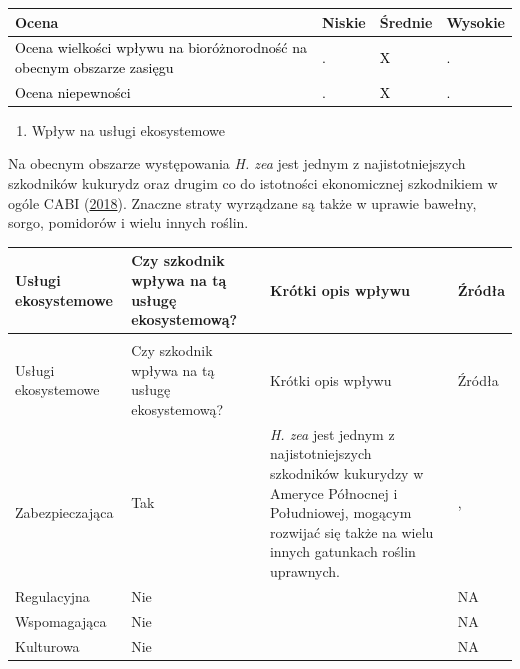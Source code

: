 \documentclass[polish,a4paper]{article}
\providecommand{\tightlist}{%
  \setlength{\itemsep}{0pt}\setlength{\parskip}{0pt}}
\begin{document}
\begin{tabu} to 
\toprule
{}  \textbf{Ocena} & \textbf{Niskie} & \textbf{Średnie} & \textbf{Wysokie}\\
\midrule
{}  \textcolor{black}{Ocena wielkości wpływu na bioróżnorodność na obecnym obszarze zasięgu} & \textcolor{black}{.} & \textcolor{black}{X} & \textcolor{black}{.}\\
  \textcolor{black}{Ocena niepewności} & \textcolor{black}{.} & \textcolor{black}{X} & \textcolor{black}{.}\\
\bottomrule
\end{tabu}

\begin{enumerate}
\def\labelenumi{\Roman{enumi})}
\setcounter{enumi}{1}
\tightlist
\item
  Wpływ na usługi ekosystemowe
\end{enumerate}

Na obecnym obszarze występowania \emph{H. zea} jest jednym z
najistotniejszych szkodników kukurydz oraz drugim co do istotności
ekonomicznej szkodnikiem w ogóle CABI
(\protect\hyperlink{ref-cabi2017}{2018}). Znaczne straty wyrządzane są
także w uprawie bawełny, sorgo, pomidorów i wielu innych roślin.

\begin{longtabu} to 
\toprule
{}  \textbf{Usługi ekosystemowe} & \textbf{Czy szkodnik wpływa na tą usługę ekosystemową?} & \textbf{Krótki opis wpływu} & \textbf{Źródła}\\
\midrule
\endfirsthead
{}\\
\toprule
Usługi ekosystemowe & Czy szkodnik wpływa na tą usługę ekosystemową? & Krótki opis wpływu & Źródła\\
\midrule
\endhead
\
\endfoot
\bottomrule
\endlastfoot
Zabezpieczająca & Tak & \textit{H. zea} jest jednym z najistotniejszych szkodników kukurydzy w Ameryce Północnej i Południowej, mogącym rozwijać się także na wielu innych gatunkach roślin uprawnych. & \citeauthor{kogan1989}, \hyperlink{ref-kogan1989}{\citeyear{kogan1989}}\\
Regulacyjna & Nie &  & NA\\
Wspomagająca & Nie &  & NA\\
Kulturowa & Nie &  & NA\\*
\end{longtabu}
\end{document}
